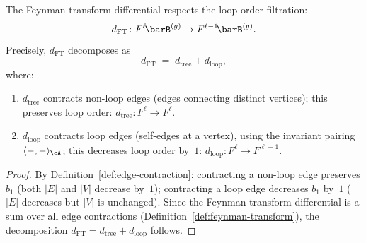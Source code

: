 \begin{proposition}\label{prop:loop-filtration-compatible}
The Feynman transform differential respects the loop order
filtration:
\begin{equation}\label{eq:loop-filtration-d}
d_{\mathrm{FT}} \colon
F^\ell\!\barB^{(g)} \to F^{\ell-1}\!\barB^{(g)}.
\end{equation}
Precisely, $d_{\mathrm{FT}}$ decomposes as
\begin{equation}\label{eq:d-tree-loop}
d_{\mathrm{FT}}
\;=\; d_{\mathrm{tree}} + d_{\mathrm{loop}},
\end{equation}
where:
\begin{enumerate}[label=\textup{(\alph*)}]
\item $d_{\mathrm{tree}}$ contracts non-loop edges
 \textup{(}edges connecting distinct vertices\textup{)};
 this preserves loop order:
 $d_{\mathrm{tree}}\colon F^\ell \to F^\ell$.
\item $d_{\mathrm{loop}}$ contracts loop edges
 \textup{(}self-edges at a vertex\textup{)}, using the invariant
 pairing $\langle -, - \rangle_\cA$;
 this decreases loop order by~$1$:
 $d_{\mathrm{loop}}\colon F^\ell \to F^{\ell-1}$.
\end{enumerate}
\end{proposition}

\begin{proof}
By Definition~\ref{def:edge-contraction}: contracting a non-loop
edge preserves $b_1$ (both $|E|$ and $|V|$ decrease by~$1$);
contracting a loop edge decreases $b_1$ by~$1$ ($|E|$ decreases
but $|V|$ is unchanged). Since the Feynman transform differential
is a sum over all edge contractions
(Definition~\ref{def:feynman-transform}), the decomposition
$d_{\mathrm{FT}} = d_{\mathrm{tree}} + d_{\mathrm{loop}}$ follows.
\end{proof}

